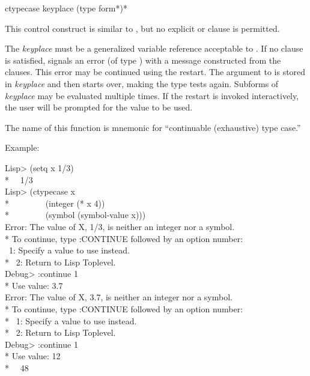 \begin{defmac}
ctypecase keyplace {(type {form}*)}*

This control construct is similar to , but no explicit
 or  clause is permitted.

The \emph{keyplace} must be a generalized variable reference acceptable to
.  If no clause is satisfied,  signals an error (of
type ) with a message constructed from the clauses. This error
may be continued using the  restart. The argument to
 is stored in \emph{keyplace} and then  starts
over, making the type tests again.  Subforms of \emph{keyplace} may be evaluated
multiple times. If the  restart is invoked interactively, the
user will be prompted for the value to be used.
  
The name of this function is mnemonic for ``continuable (exhaustive) type
case.''

Example:
\begin{lisp}
Lisp> (setq x 1/3) \\*
~\EV\ 1/3 \\
Lisp> (ctypecase x \\*
~~~~~~~~(integer (* x 4)) \\*
~~~~~~~~(symbol (symbol-value x))) \\
Error: The value of X, 1/3, is neither an integer nor a symbol. \\*
To continue, type :CONTINUE followed by an option number: \\
~1: Specify a value to use instead. \\*
~2: Return to Lisp Toplevel. \\
Debug> :continue 1 \\*
Use value: 3.7 \\
Error: The value of X, 3.7, is neither an integer nor a symbol. \\*
To continue, type :CONTINUE followed by an option number: \\*
~1: Specify a value to use instead. \\*
~2: Return to Lisp Toplevel. \\
Debug> :continue 1 \\*
Use value: 12 \\*
~\EV\ 48
\end{lisp}
\end{defmac}


